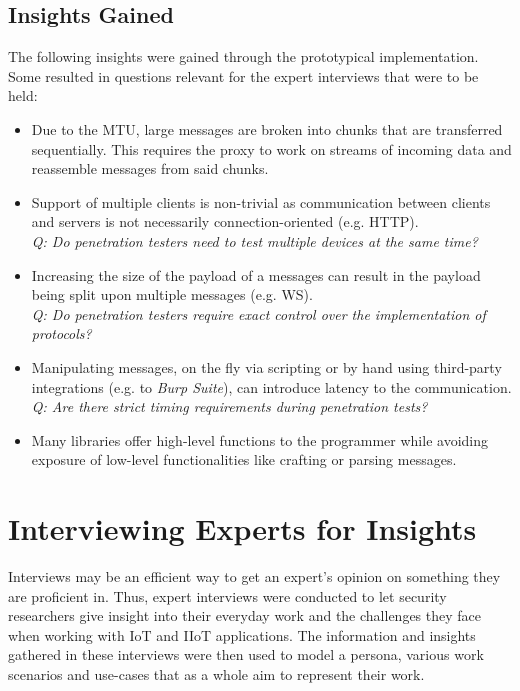 \subsection{Insights Gained}
The following insights were gained through the prototypical implementation. Some resulted in questions relevant for the expert interviews that were to be held:
\begin{itemize}
    \item Due to the \ac{MTU}, large messages are broken into chunks that are transferred sequentially. This requires the proxy to work on streams of incoming data and reassemble messages from said chunks. %
    \item Support of multiple clients is non-trivial as communication between clients and servers is not necessarily connection-oriented (e.g. \ac{HTTP}).\\
          \emph{Q: Do penetration testers need to test multiple devices at the same time?}
    \item Increasing the size of the payload of a messages can result in the payload being split upon multiple messages (e.g. \ac{WS}).\\
          \emph{Q: Do penetration testers require exact control over the implementation of protocols?}
    \item Manipulating messages, on the fly via scripting or by hand using third-party integrations (e.g. to \emph{Burp Suite}), can introduce latency to the communication. \emph{Q: Are there strict timing requirements during penetration tests?}
    \item Many libraries offer high-level functions to the programmer while avoiding exposure of low-level functionalities like crafting or parsing messages.
\end{itemize}


\section{Interviewing Experts for Insights}
\label{sec:interviews}
Interviews may be an efficient way to get an expert’s opinion on something they are proficient in. Thus, expert interviews were conducted to let security researchers give insight into their everyday work and the challenges they face when working with \ac{IoT} and \ac{IIoT} applications. The information and insights gathered in these interviews were then used to model a persona, various work scenarios and use-cases that as a whole aim to represent their work.

